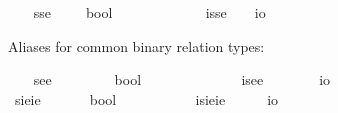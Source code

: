 \begin{isabellebody}
\ \ \isamarkupfalse%
\ sse\ {\isacharequal}\ \ \ \ {\isachardoublequoteopen}{\isasymlangle}{\isasymzero}{\isasymrangle}{\isasymRightarrow}bool{\isachardoublequoteclose}\ \ \ \ \ \ \ \ \ {\isacharparenleft}{\isachardoublequoteopen}{\isasymlangle}{\isasymlangle}{\isasymzero}{\isasymrangle}{\isasymrangle}{\isachardoublequoteclose}{\isacharparenright}\isanewline
\ \ \isamarkupfalse%
\ isse\ {\isacharequal}\ \ \ {\isachardoublequoteopen}{\isasymlangle}{\isasymzero}{\isasymrangle}{\isasymRightarrow}io{\isachardoublequoteclose}\ \ \ \ \ \ \ \ \ \ {\isacharparenleft}{\isachardoublequoteopen}{\isasymup}{\isasymlangle}{\isasymlangle}{\isasymzero}{\isasymrangle}{\isasymrangle}{\isachardoublequoteclose}{\isacharparenright}%
\begin{isamarkuptext}%
Aliases for common binary relation types:%
\end{isamarkuptext}\isamarkuptrue%
\ \ \isamarkupfalse%
\ see\ {\isacharequal}\ \ \ \ \ \ \ \ {\isachardoublequoteopen}{\isacharparenleft}{\isasymzero}{\isasymRightarrow}{\isasymzero}{\isasymRightarrow}bool{\isacharparenright}{\isachardoublequoteclose}\ \ \ \ \ \ \ \ \ \ {\isacharparenleft}{\isachardoublequoteopen}{\isasymlangle}{\isasymzero}{\isacharcomma}{\isasymzero}{\isasymrangle}{\isachardoublequoteclose}{\isacharparenright}\isanewline
\ \ \isamarkupfalse%
\ isee\ {\isacharequal}\ \ \ \ \ \ \ {\isachardoublequoteopen}{\isacharparenleft}{\isasymzero}{\isasymRightarrow}{\isasymzero}{\isasymRightarrow}io{\isacharparenright}{\isachardoublequoteclose}\ \ \ \ \ \ \ \ \ \ \ {\isacharparenleft}{\isachardoublequoteopen}{\isasymup}{\isasymlangle}{\isasymzero}{\isacharcomma}{\isasymzero}{\isasymrangle}{\isachardoublequoteclose}{\isacharparenright}\isanewline
\ \ \isamarkupfalse%
\ sieie\ {\isacharequal}\ \ \ \ \ \ {\isachardoublequoteopen}{\isacharparenleft}{\isasymup}{\isasymzero}{\isasymRightarrow}{\isasymup}{\isasymzero}{\isasymRightarrow}bool{\isacharparenright}{\isachardoublequoteclose}\ \ \ \ \ \ \ {\isacharparenleft}{\isachardoublequoteopen}{\isasymlangle}{\isasymup}{\isasymzero}{\isacharcomma}{\isasymup}{\isasymzero}{\isasymrangle}{\isachardoublequoteclose}{\isacharparenright}\isanewline
\ \ \isamarkupfalse%
\ isieie\ {\isacharequal}\ \ \ \ \ {\isachardoublequoteopen}{\isacharparenleft}{\isasymup}{\isasymzero}{\isasymRightarrow}{\isasymup}{\isasymzero}{\isasymRightarrow}io{\isacharparenright}{\isachardoublequoteclose}\ \ \ \ \ \ \ \ {\isacharparenleft}{\isachardoublequoteopen}{\isasymup}{\isasymlangle}{\isasymup}{\isasymzero}{\isacharcomma}{\isasymup}{\isasymzero}{\isasymrangle}{\isachardoublequoteclose}{\isacharparenright}\isanewline

\end{isabellebody}
